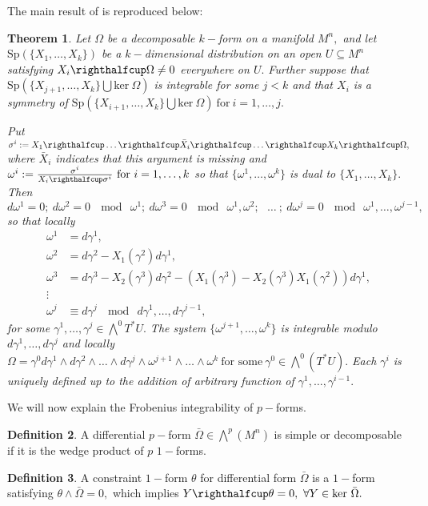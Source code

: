 \documentclass[a4paper, 11pt]{amsart}
\newtheorem{theorem}{Theorem}
\theoremstyle{definition}
\newtheorem{definition}[theorem]{Definition}
\begin{document}
 The main result of \cite{sherr} is reproduced below:
\begin{theorem} \label{sherr result}
 Let $\Omega$ be a decomposable $k-$form on a manifold $M^n,$ and let ${\text{Sp}}(\{X_1,\ldots, X_k\})$ be a $k-$dimensional distribution on an open $U\subseteq M^n$ satisfying $X_i\righthalfcup \Omega\neq 0$ everywhere on $U.$ Further suppose that ${\text{Sp}}(\{X_{j+1},\ldots, X_k\}\bigcup\text{ker}~\Omega)$ is integrable for some $j<k$ and that $X_i$ is a symmetry of ${\text{Sp}}(\{X_{i+1},\ldots, X_{k}\}\bigcup \text{ker}~\Omega)~\text{for}~ i=1,\ldots, j.$

 Put $\sigma^i:=X_1\righthalfcup \ldots \righthalfcup \bar{X}_i\righthalfcup\ldots\righthalfcup X_k\righthalfcup\Omega,$
where $\bar{X}_i$ indicates that this argument is missing and $\omega^i:=\frac{\sigma^i}{X_i\righthalfcup \sigma^i}~ \text{for}~i=1,\ldots,k$
so that $\{\omega^1,\ldots, \omega^k\}$ is dual to $\{X_1,\ldots, X_k\}.$ Then $d \omega^1=0;~d \omega^2=0~\mod~\omega^1;~d \omega^3=0~\mod~\omega^1,\omega^2;~~~\ldots~;~ d \omega^j=0~\mod~\omega^1,\ldots,\omega^{j-1},$ so that locally
 \begin{align*}
   \omega^1&=d \gamma^1,\\
   \omega^2&=d \gamma^2-X_1(\gamma^2)d\gamma^1,\\
   \omega^3&=d \gamma^3-X_2(\gamma^3)d\gamma^2-(X_1(\gamma^3)
   -X_2(\gamma^3)X_1(\gamma^2))d\gamma^1,\\ \vdots\\
  \omega^{j}&\equiv d \gamma^{j}~\mod~d\gamma^1,\ldots, d\gamma^{j-1},
 \end{align*}
 for some $\gamma^1,\ldots,\gamma^j\in \bigwedge^0 T^* U.$ The system $\{\omega^{j+1},\ldots,\omega^k\}$ is integrable modulo $d\gamma^1,\ldots, d\gamma^j$ and locally $\Omega=\gamma^0 d\gamma^1\wedge d\gamma^2 \wedge \ldots \wedge d\gamma^j\wedge \omega^{j+1}\wedge\ldots \wedge \omega^k ~\text{for some}~\gamma^0\in \bigwedge^0(T^* U).$ Each $\gamma^i$ is uniquely defined up to the addition of arbitrary function of $\gamma^1,\ldots,\gamma^{i-1}.$
 \end{theorem}
\noindent We will now explain the Frobenius integrability of $p-$forms.
\begin{definition}
A differential $p-$form $\bar\Omega\in\bigwedge^p(M^n)$ is simple or decomposable if it is the wedge product of $p$ $1-$forms.
\end{definition}
\begin{definition}
A constraint $1-$form $\theta$ for differential form $\bar\Omega$ is a $1-$form satisfying $\theta\wedge{\bar\Omega}=0,$ which implies $Y\righthalfcup\theta=0,~ \forall Y\in \text{ker}~{\bar\Omega}.$
\end{definition}
\end{document}
